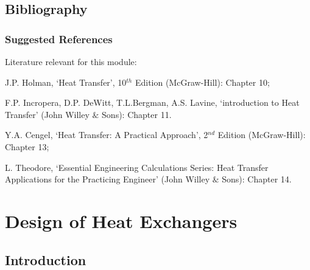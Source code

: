 \documentclass[10pt,compress]{beamer}
\begin{document}
\subsection{Bibliography} 

\begin{frame}
 \frametitle{Suggested References}
  Literature relevant for this module:
  \begin{enumerate}[{[}1{]}]
    \item J.P. Holman, `Heat Transfer', 10$^{th}$ Edition (McGraw-Hill): Chapter 10;
    \item F.P. Incropera, D.P. DeWitt, T.L.Bergman, A.S. Lavine, `introduction to Heat Transfer' (John Willey $\&$ Sons): Chapter 11.
    \item Y.A. Cengel, `Heat Transfer: A Practical Approach', 2$^{nd}$ Edition (McGraw-Hill): Chapter 13;
    \item L. Theodore, `Essential Engineering Calculations Series: Heat Transfer Applications for the Practicing Engineer' (John Willey $\&$ Sons): Chapter 14.
  \end{enumerate}
\end{frame}

\section{Design of Heat Exchangers}

\subsection{Introduction}
\end{document}
